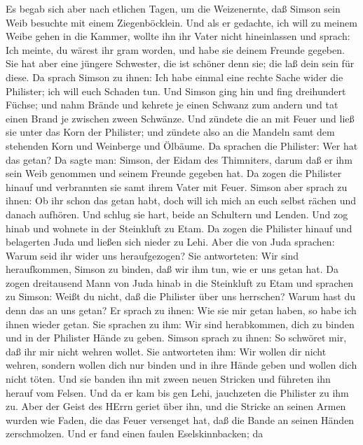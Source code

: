  Es begab sich aber nach etlichen Tagen, um die Weizenernte,
daß Simson sein Weib besuchte mit einem Ziegenböcklein. Und als er
gedachte, ich will zu meinem Weibe gehen in die Kammer, wollte ihn ihr
Vater nicht hineinlassen  und sprach: Ich meinte, du wärest
ihr gram worden, und habe sie deinem Freunde gegeben. Sie hat aber eine
jüngere Schwester, die ist schöner denn sie; die laß dein sein für
diese.  Da sprach Simson zu ihnen: Ich habe einmal eine
rechte Sache wider die Philister; ich will euch Schaden tun.
 Und Simson ging hin und fing dreihundert Füchse; und nahm
Brände und kehrete je einen Schwanz zum andern und tat einen Brand je
zwischen zween Schwänze.  Und zündete die an mit Feuer und
ließ sie unter das Korn der Philister; und zündete also an die Mandeln
samt dem stehenden Korn und Weinberge und Ölbäume.  Da
sprachen die Philister: Wer hat das getan? Da sagte man: Simson, der
Eidam des Thimniters, darum daß er ihm sein Weib genommen und seinem
Freunde gegeben hat. Da zogen die Philister hinauf und verbrannten sie
samt ihrem Vater mit Feuer.  Simson aber sprach zu ihnen: Ob
ihr schon das getan habt, doch will ich mich an euch selbst rächen und
danach aufhören.  Und schlug sie hart, beide an Schultern
und Lenden. Und zog hinab und wohnete in der Steinkluft zu Etam.
 Da zogen die Philister hinauf und belagerten Juda und
ließen sich nieder zu Lehi.  Aber die von Juda sprachen:
Warum seid ihr wider uns heraufgezogen? Sie antworteten: Wir sind
heraufkommen, Simson zu binden, daß wir ihm tun, wie er uns getan hat.
 Da zogen dreitausend Mann von Juda hinab in die Steinkluft
zu Etam und sprachen zu Simson: Weißt du nicht, daß die Philister über
uns herrschen? Warum hast du denn das an uns getan? Er sprach zu ihnen:
Wie sie mir getan haben, so habe ich ihnen wieder getan. 
Sie sprachen zu ihm: Wir sind herabkommen, dich zu binden und in der
Philister Hände zu geben. Simson sprach zu ihnen: So schwöret mir, daß
ihr mir nicht wehren wollet.  Sie antworteten ihm: Wir
wollen dir nicht wehren, sondern wollen dich nur binden und in ihre
Hände geben und wollen dich nicht töten. Und sie banden ihn mit zween
neuen Stricken und führeten ihn herauf vom Felsen.  Und da
er kam bis gen Lehi, jauchzeten die Philister zu ihm zu. Aber der Geist
des HErrn geriet über ihn, und die Stricke an seinen Armen wurden wie
Faden, die das Feuer versenget hat, daß die Bande an seinen Händen
zerschmolzen.  Und er fand einen faulen Eselskinnbacken; da

